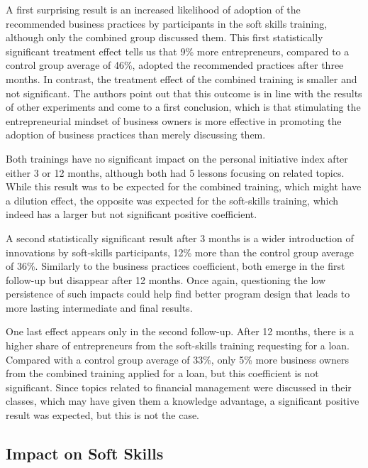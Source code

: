 A first surprising result is an increased likelihood of adoption of the recommended business practices by participants in the soft skills training, although only the combined group discussed them. This first statistically significant treatment effect tells us that 9\% more entrepreneurs, compared to a control group average of 46\%, adopted the recommended practices after three months. In contrast, the treatment effect of the combined training is smaller and not significant. The authors point out that this outcome is in line with the results of other experiments and come to a first conclusion, which is that stimulating the entrepreneurial mindset of business owners is more effective in promoting the adoption of business practices than merely discussing them.

Both trainings have no significant impact on the personal initiative index after either 3 or 12 months, although both had 5 lessons focusing on related topics. While this result was to be expected for the combined training, which might have a dilution effect, the opposite was expected for the soft-skills training, which indeed has a larger but not significant positive coefficient.

A second statistically significant result after 3 months is a wider introduction of innovations by soft-skills participants, 12\% more than the control group average of 36\%. Similarly to the business practices coefficient, both emerge in the first follow-up but disappear after 12 months. Once again, questioning the low persistence of such impacts could help find better program design that leads to more lasting intermediate and final results.

One last effect appears only in the second follow-up. After 12 months, there is a higher share of entrepreneurs from the soft-skills training requesting for a loan. Compared with a control group average of 33\%, only 5\% more business owners from the combined training applied for a loan, but this coefficient is not significant. Since topics related to financial management were discussed in their classes, which may have given them a knowledge advantage, a significant positive result was expected, but this is not the case.

\vspace{-5px}

\subsection{Impact on Soft Skills}

